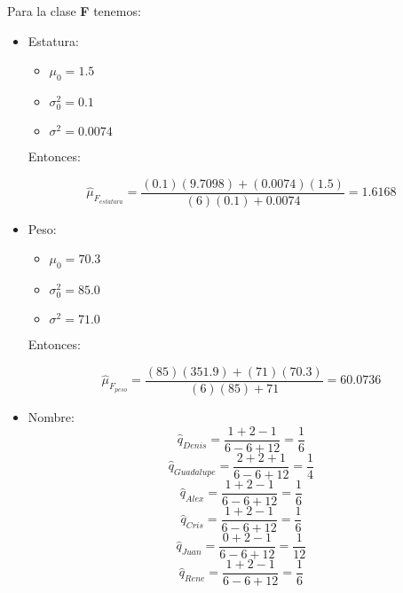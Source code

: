 \documentclass[letterpaper,12pt]{article}
\theoremstyle{definition}
\begin{document}
Para la clase \textbf{F} tenemos:\\

\begin{itemize}
  \item Estatura:
  \begin{itemize}
    \item \(\mu_0 = 1.5\)
    \item \(\sigma^2_0 = 0.1\)
    \item \(\sigma^2 = 0.0074\)
  \end{itemize}
  
  Entonces:
  
  \begin{equation}
    \hat{\mu}_{F_{estatura}} = \frac{(0.1)(9.7098) + (0.0074)(1.5)}{(6)(0.1) + 0.0074} = 1.6168
  \end{equation}
  \item Peso:
  \begin{itemize}
    \item \(\mu_0 = 70.3\)
    \item \(\sigma^2_0 = 85.0\)
    \item \(\sigma^2 = 71.0\)
  \end{itemize}
  
  Entonces:
  
  \begin{equation}
    \hat{\mu}_{F_{peso}} = \frac{(85)(351.9) + (71)(70.3)}{(6)(85) + 71} = 60.0736
  \end{equation}
  \item Nombre:
  \begin{equation}
    \hat{q}_{Denis} = \frac{1+2-1}{6-6+12} = \frac{1}{6} 
  \end{equation}
  \begin{equation}
    \hat{q}_{Guadalupe} = \frac{2+2+1}{6-6+12} = \frac{1}{4} 
  \end{equation}
  \begin{equation}
    \hat{q}_{Alex} = \frac{1+2-1}{6-6+12} = \frac{1}{6} 
  \end{equation}
  \begin{equation}
    \hat{q}_{Cris} = \frac{1+2-1}{6-6+12} = \frac{1}{6} 
  \end{equation}
  \begin{equation}
    \hat{q}_{Juan} = \frac{0+2-1}{6-6+12} = \frac{1}{12} 
  \end{equation}
  \begin{equation}
    \hat{q}_{Rene} = \frac{1+2-1}{6-6+12} = \frac{1}{6} 
  \end{equation}
\end{itemize}
\end{document}
